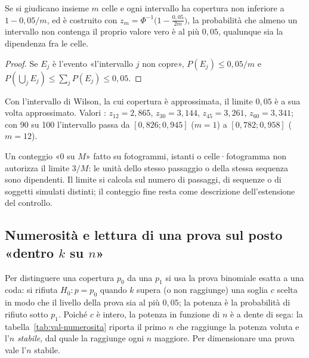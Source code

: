 \begin{proposizione}\label{prop:val-celle}
Se si giudicano insieme $m$ celle e ogni intervallo ha copertura non inferiore a $1-0{,}05/m$, ed è costruito con $z_m=\Phi^{-1}\bigl(1-\tfrac{0{,}05}{2m}\bigr)$, la probabilità che almeno un intervallo non contenga il proprio valore vero è al più $0{,}05$, qualunque sia la dipendenza fra le celle. 
\end{proposizione}
\begin{proof}
Se $E_j$ è l'evento «l'intervallo $j$ non copre», $P(E_j)\le0{,}05/m$ e $P(\bigcup_jE_j)\le\sum_jP(E_j)\le0{,}05$.
\end{proof}
Con l'intervallo di Wilson, la cui copertura è approssimata, il limite $0{,}05$ è a sua volta approssimato.
Valori : $z_{12}=2{,}865$, $z_{30}=3{,}144$, $z_{45}=3{,}261$, $z_{60}=3{,}341$; con 90 su 100 l'intervallo passa da $[0{,}826;0{,}945]$ ($m=1$) a $[0{,}782;0{,}958]$ ($m=12$).

\begin{osservazione}\label{oss:val-unita}
Un conteggio «0 su $M$» fatto su fotogrammi, istanti o celle·fotogramma non autorizza il limite $3/M$: le unità dello stesso passaggio o della stessa sequenza sono dipendenti. Il limite si calcola sul numero di passaggi, di sequenze o di soggetti simulati distinti; il conteggio fine resta come descrizione dell'estensione del controllo.
\end{osservazione}

\subsection{Numerosità e lettura di una prova sul posto «dentro $k$ su $n$»}\label{sec:val-numerosita}

Per distinguere una copertura $p_0$ da una $p_1$ si usa la prova binomiale esatta a una coda: si rifiuta $H_0\colon p=p_0$ quando $k$ supera (o non raggiunge) una soglia $c$ scelta in modo che il livello della prova sia al più $0{,}05$; la potenza è la probabilità di rifiuto sotto $p_1$. Poiché $c$ è intero, la potenza in funzione di $n$ è a dente di sega: la tabella~\ref{tab:val-numerosita} riporta il primo $n$ che raggiunge la potenza voluta e l'$n$ \emph{stabile}, dal quale la raggiunge ogni $n$ maggiore. Per dimensionare una prova vale l'$n$ stabile.

